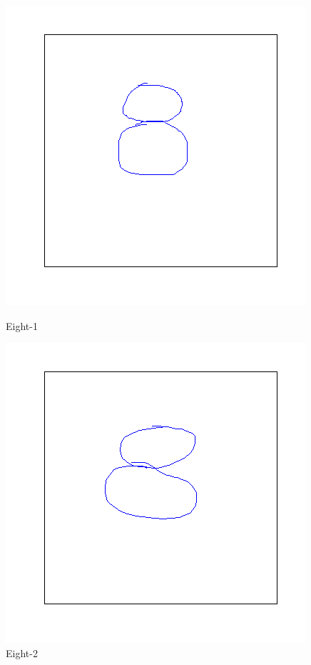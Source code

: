 \documentclass[a4paper, 10pt]{article}
\begin{document}
\begin{figure}[ht]
\begin{minipage}[b]{0.45\linewidth}
\centering
\includegraphics[width=\textwidth]{figs/8-1}
\caption{Eight-1}
\label{fig:figure1}
\end{minipage}
\hspace{0.5cm}
\begin{minipage}[b]{0.45\linewidth}
\centering
\includegraphics[width=\textwidth]{figs/8-2}
\caption{Eight-2}
\label{fig:figure2}
\end{minipage}
\end{figure}
\end{document}
